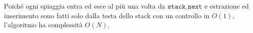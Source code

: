 Poiché ogni spiaggia entra ed esce al più una volta da $\texttt{stack\_next}$ e estrazione ed inserimento sono fatti solo dalla testa dello stack con un controllo in $O(1)$, l'algoritmo ha complessità $O(N)$.



\CppSolution

%
\colorbox{white}{}

\afterpage{\nopagecolor}
